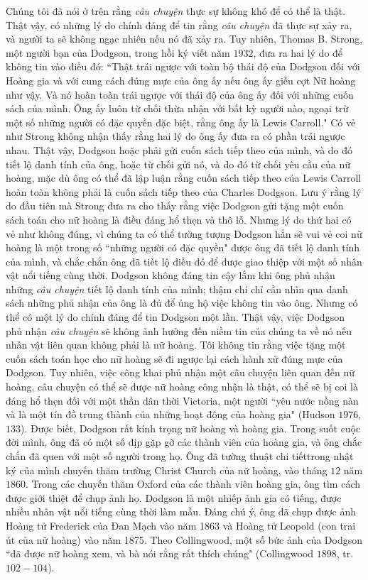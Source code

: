 \begin{multicols}{2}
	\vskip 0.1cm
	Chúng tôi đã nói ở trên rằng \textit{câu chuyện} thực sự không khó để có thể là  thật. Thật vậy, có những lý do chính đáng để tin rằng \textit{câu chuyện} đã thực sự xảy ra, và người ta sẽ không ngạc nhiên nếu nó đã xảy ra. Tuy nhiên, Thomas B. Strong, một người bạn của Dodgson, trong hồi ký viết năm $1932$, đưa ra hai lý do để không tin vào điều đó:
	\vskip 0.1cm
	``Thật trái ngược với toàn bộ thái độ của Dodgson đối với Hoàng gia và với cung cách đúng mực của ông ấy nếu  ông ấy giễu cợt Nữ hoàng như vậy. Và nó hoàn toàn trái ngược với thái độ của ông ấy đối với những cuốn sách của mình. Ông ấy luôn từ chối thừa nhận với bất kỳ người nào, ngoại trừ một số những người có đặc quyền đặc biệt, rằng ông ấy là Lewis Carroll."
	\vskip 0.1cm
	Có vẻ như Strong không nhận thấy rằng hai lý do ông ấy đưa ra có phần trái ngược nhau. Thật vậy, Dodgson hoặc phải gửi cuốn sách tiếp theo của mình, và do đó tiết lộ danh tính của ông, hoặc từ chối gửi nó, và do đó từ chối yêu cầu của nữ hoàng, mặc dù ông có thể đã  lập luận rằng cuốn sách tiếp theo của Lewis Carroll hoàn toàn không phải là cuốn sách tiếp theo của Charles Dodgson.
	\vskip 0.1cm
	Lưu ý rằng lý do đầu tiên mà Strong đưa ra cho thấy rằng việc Dodgson gửi tặng một cuốn sách toán cho nữ hoàng là điều đáng hổ thẹn và thô lỗ. Nhưng lý do thứ hai có vẻ như không đúng, vì chúng ta có thể tưởng tượng Dodgson hẳn sẽ vui vẻ coi nữ hoàng là một trong số ``những người có đặc quyền" được ông đã tiết lộ danh tính của mình, và chắc chắn ông đã tiết lộ điều đó để được giao thiệp với một số nhân vật nổi tiếng cùng thời.
	\vskip 0.1cm
	Dodgson không đáng tin cậy lắm khi ông phủ nhận những \textit{câu chuyện} tiết lộ danh tính của mình; thậm chí chỉ cần nhìn qua danh sách những phủ nhận của ông là đủ để ủng hộ việc không tin vào ông. Nhưng có thể có một lý do chính đáng để tin Dodgson một lần. Thật vậy, việc Dodgson phủ nhận \textit{câu chuyện} sẽ không ảnh hưởng đến niềm tin của chúng ta về nó nếu nhân vật liên quan không phải là nữ hoàng. Tôi không tin rằng việc tặng một cuốn sách toán học cho nữ hoàng sẽ đi ngược lại cách hành xử đúng mực của Dodgson. Tuy nhiên, việc công khai phủ nhận một câu chuyện liên quan đến nữ hoàng, câu chuyện có thể sẽ được nữ hoàng công nhận là thật, có thể sẽ bị coi là đáng hổ thẹn đối với một thần dân thời Victoria, một người ``yêu nước nồng nàn và là một tín đồ trung thành của những hoạt động của hoàng gia" (Hudson $1976$, $133$).
	\vskip 0.1cm
	Được biết, Dodgson rất kính trọng nữ hoàng và hoàng gia. Trong suốt cuộc đời mình, ông đã có một số dịp gặp gỡ các thành viên của hoàng gia, và ông chắc chắn đã quen với một số người trong họ. Ông đã tường thuật chi tiếttrong nhật ký của mình chuyến thăm trường Christ Church của nữ hoàng, vào tháng $12$ năm $1860$. Trong các chuyến thăm Oxford của các thành viên hoàng gia, ông tìm cách được giới thiệt để chụp ảnh họ. Dodgson là một nhiếp ảnh gia có tiếng, được nhiều nhân vật nổi tiếng cùng thời làm mẫu. Đáng chú ý, ông đã chụp được ảnh Hoàng tử Frederick của Đan Mạch vào năm 1863 và Hoàng tử Leopold (con trai út của nữ hoàng) vào năm 1875. Theo Collingwood, một số bức ảnh của  Dodgson ``đã được nữ hoàng xem, và bà nói rằng rất thích chúng"  (Collingwood $1898$, tr. $102-104$).

\end{multicols}
